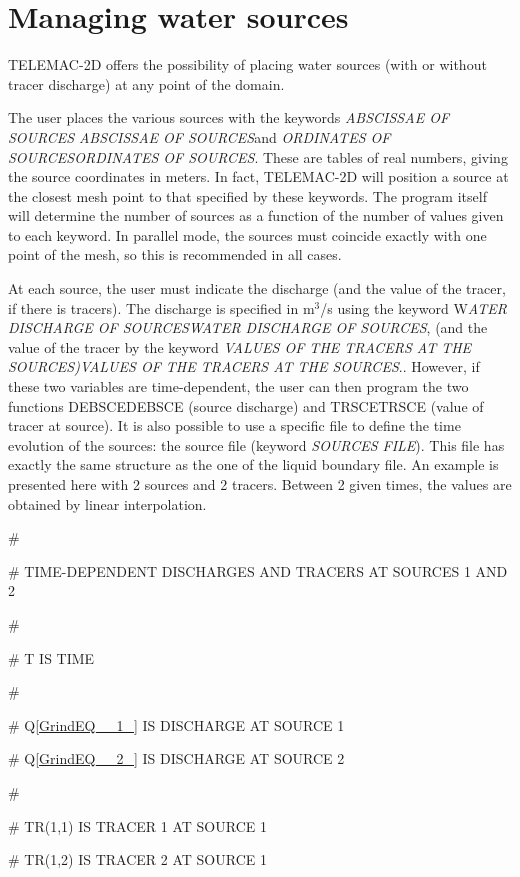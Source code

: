 \documentclass{article} %
\begin{document}
\section{ Managing water sources}

 TELEMAC-2D offers the possibility of placing water sources (with or without tracer discharge) at any point of the domain.

 The user places the various sources with the keywords \textit{ABSCISSAE OF SOURCES} \textit{ABSCISSAE OF SOURCES}and \textit{ORDINATES OF SOURCESORDINATES OF SOURCES}. These are tables of real numbers, giving the source coordinates in meters. In fact, TELEMAC-2D will position a source at the closest mesh point to that specified by these keywords. The program itself will determine the number of sources as a function of the number of values given to each keyword. In parallel mode, the sources must coincide exactly with one point of the mesh, so this is recommended in all cases.

 At each source, the user must indicate the discharge (and the value of the tracer, if there is tracers). The discharge is specified in m${}^{3}$/s using the keyword W\textit{ATER DISCHARGE OF SOURCESWATER DISCHARGE OF SOURCES}, (and the value of the tracer by the keyword \textit{VALUES OF THE TRACERS AT THE SOURCES)VALUES OF THE TRACERS AT THE SOURCES}.. However, if these two variables are time-dependent, the user can then program the two functions DEBSCEDEBSCE (source discharge) and TRSCETRSCE (value of tracer at source). It is also possible to use a specific file to define the time evolution of the sources: the source file (keyword \textit{SOURCES FILE}). This file has exactly the same structure as the one of the liquid boundary file. An example is presented here with 2 sources and 2 tracers. Between 2 given times, the values are obtained by linear interpolation.

 \#

 \# TIME-DEPENDENT DISCHARGES AND TRACERS AT SOURCES 1 AND 2

 \#

 \#  T IS TIME

 \#

 \#  Q\eqref{GrindEQ__1_} IS DISCHARGE AT SOURCE 1

 \#  Q\eqref{GrindEQ__2_} IS DISCHARGE AT SOURCE 2

 \#

 \#  TR(1,1) IS TRACER 1 AT SOURCE 1

 \#  TR(1,2) IS TRACER 2 AT SOURCE 1
\end{document}
